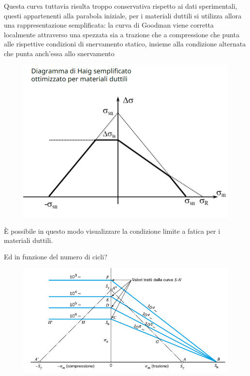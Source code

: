 			Questa curva tuttavia risulta troppo conservativa rispetto ai dati sperimentali, questi appartenenti alla parabola iniziale, per i materiali duttili si utilizza allora una rappresentazione semplificata: la curva di Goodman viene corretta localmente attraverso una spezzata sia a trazione che a compressione che punta alle rispettive condizioni di snervamento statico, insieme alla condizione alternata che punta anch'essa allo snervamento
			\begin{figure}[H]
				\centering
				\includegraphics[width=0.5\linewidth]{immagini_11/screenshot007}
				\label{fig:screenshot007}
			\end{figure}			
			È possibile in questo modo visualizzare la condizione limite a fatica per i materiali duttili. \newline
			 
			Ed in funzione del numero di cicli? 
			\begin{figure}[H]
				\centering
				\includegraphics[width=0.5\linewidth]{immagini_11/screenshot008}
				\label{fig:screenshot008}
			\end{figure}
\newpage			

